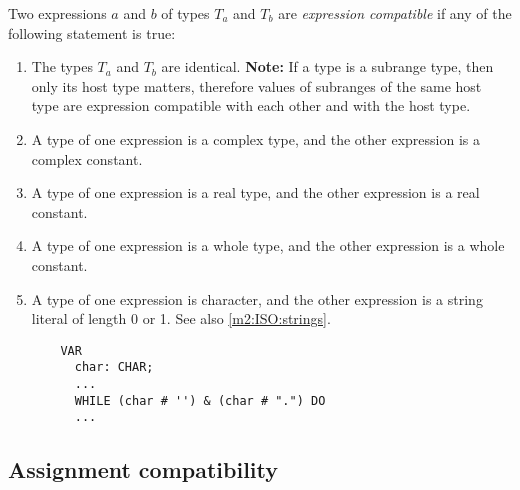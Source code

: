 Two expressions $a$ and $b$ of types $T_a$ and $T_b$
are {\em expression compatible} if any of the following
statement is true:
\renewcommand{\theenumi}{\alph{enumi}}
\begin{enumerate}
\item The types $T_a$ and $T_b$ are identical.
        {\bf Note:} If a type is a subrange type, then only its host type
        matters, therefore values of subranges of the same host
        type are expression compatible with each other and with
        the host type.

\item A type of one expression is a complex type, and the other
      expression is a complex constant.

\item A type of one expression is a real type, and the other
      expression is a real constant.

\item A type of one expression is a whole type, and the other
      expression is a whole constant.

\item A type of one expression is character, and the other
      expression is a string literal of length 0 or 1.
      See also \ref{m2:ISO:strings}.

\begin{verbatim}
    VAR
      char: CHAR;
      ...
      WHILE (char # '') & (char # ".") DO
      ...
\end{verbatim}

\end{enumerate}
\renewcommand{\theenumi}{\arabic{enumi}}

\subsection{Assignment compatibility}\label{m2:ISO:comp:assign}

